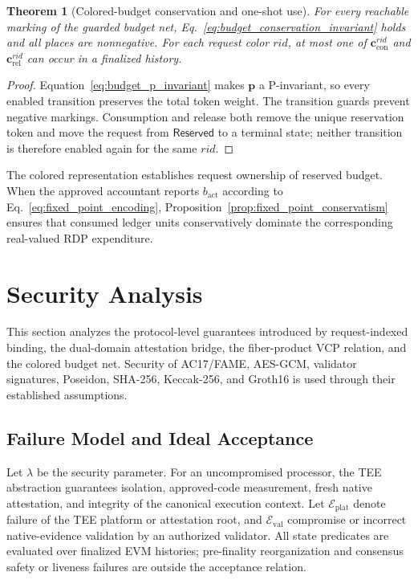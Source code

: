 \documentclass[10pt,journal,compsoc]{IEEEtran}
\newtheorem{theorem}{Theorem}
\begin{document}
\begin{theorem}[Colored-budget conservation and one-shot use]
\label{thm:colored_budget_conservation}
For every reachable marking of the guarded budget net, Eq.~\eqref{eq:budget_conservation_invariant} holds and all places are nonnegative. For each request color $rid$, at most one of $\mathbf{c}_{\mathrm{con}}^{rid}$ and $\mathbf{c}_{\mathrm{rel}}^{rid}$ can occur in a finalized history.
\end{theorem}

\begin{proof}
Equation~\eqref{eq:budget_p_invariant} makes $\mathbf{p}$ a P-invariant, so every enabled transition preserves the total token weight. The transition guards prevent negative markings. Consumption and release both remove the unique reservation token and move the request from $\mathsf{Reserved}$ to a terminal state; neither transition is therefore enabled again for the same $rid$.
\end{proof}

The colored representation establishes request ownership of reserved budget. When the approved accountant reports $b_{\mathrm{act}}$ according to Eq.~\eqref{eq:fixed_point_encoding}, Proposition~\ref{prop:fixed_point_conservatism} ensures that consumed ledger units conservatively dominate the corresponding real-valued RDP expenditure.
\section{Security Analysis}
\label{sec:security}

This section analyzes the protocol-level guarantees introduced by request-indexed binding, the dual-domain attestation bridge, the fiber-product VCP relation, and the colored budget net. Security of AC17/FAME, AES-GCM, validator signatures, Poseidon, SHA-256, Keccak-256, and Groth16 is used through their established assumptions.

\subsection{Failure Model and Ideal Acceptance}
\label{subsec:security_model}

Let $\lambda$ be the security parameter. For an uncompromised processor, the TEE abstraction guarantees isolation, approved-code measurement, fresh native attestation, and integrity of the canonical execution context. Let $\mathcal{E}_{\mathrm{plat}}$ denote failure of the TEE platform or attestation root, and $\mathcal{E}_{\mathrm{val}}$ compromise or incorrect native-evidence validation by an authorized validator. All state predicates are evaluated over finalized EVM histories; pre-finality reorganization and consensus safety or liveness failures are outside the acceptance relation.
\end{document}
